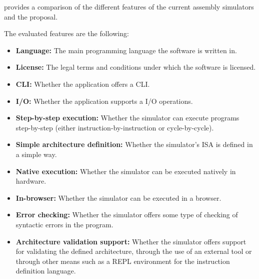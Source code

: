  provides a comparison of the different features of the current assembly simulators and the proposal.

\noindent
The evaluated features are the following:
\begin{itemize}
  \item \textbf{Language:} The main \gls{programming language} the software is written in.
  \item \textbf{License:} The legal terms and conditions under which the software is licensed.
  \item \textbf{\gls{CLI}:} Whether the application offers a \gls{CLI}.
  \item \textbf{\gls{I/O}:} Whether the application supports a \gls{I/O} operations.
  \item \textbf{Step-by-step execution:} Whether the simulator can execute programs step-by-step (either instruction-by-instruction or cycle-by-cycle).
  \item \textbf{Simple architecture definition:} Whether the simulator's \gls{ISA} is defined in a simple way.
  \item \textbf{Native execution:} Whether the simulator can be executed natively in hardware.
  \item \textbf{In-browser:} Whether the simulator can be executed in a browser.
  \item \textbf{Error checking:} Whether the simulator offers some type of checking of syntactic errors in the program.
  \item \textbf{Architecture validation support:} Whether the simulator offers support for validating the defined architecture, through the use of an external tool or through other means such as a \gls{REPL environment} for the instruction definition language.
\end{itemize}

